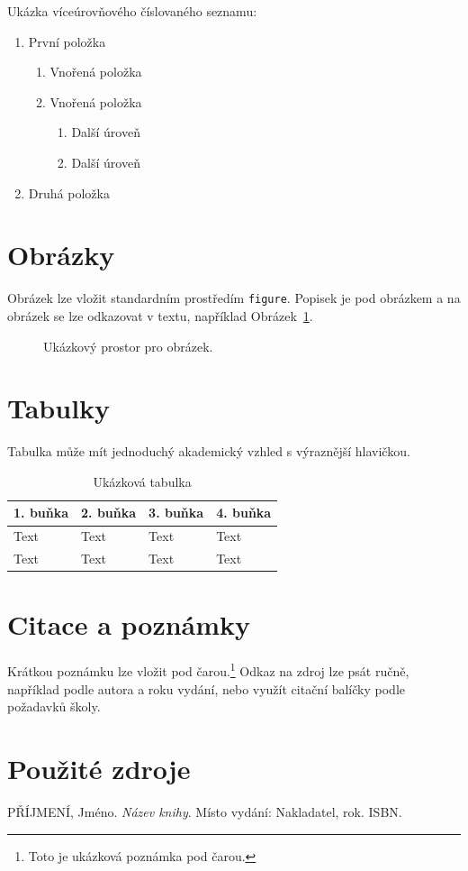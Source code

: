 \documentclass[12pt,a4paper]{article}
\begin{document}
Ukázka víceúrovňového číslovaného seznamu:
\begin{enumerate}[label=\arabic*)]
  \item První položka
  \begin{enumerate}[label=\alph*)]
    \item Vnořená položka
    \item Vnořená položka
    \begin{enumerate}[label=\roman*)]
      \item Další úroveň
      \item Další úroveň
    \end{enumerate}
  \end{enumerate}
  \item Druhá položka
\end{enumerate}

\section{Obrázky}
Obrázek lze vložit standardním prostředím \texttt{figure}. Popisek je pod obrázkem a na obrázek se lze odkazovat v textu, například Obrázek~\ref{fig:ukazka}.

\begin{figure}[h]
  \centering
  \fbox{\rule{0pt}{45mm}\rule{0.75\textwidth}{0pt}}
  \caption{Ukázkový prostor pro obrázek.}
  \label{fig:ukazka}
\end{figure}

\section{Tabulky}
Tabulka může mít jednoduchý akademický vzhled s výraznější hlavičkou.

\begin{table}[h]
  \centering
  \caption{Ukázková tabulka}
  \begin{tabularx}{\textwidth}{|Y|Y|Y|Y|}
    \hline
    \textbf{1. buňka} & \textbf{2. buňka} & \textbf{3. buňka} & \textbf{4. buňka} \\
    \hline
    Text & Text & Text & Text \\
    \hline
    Text & Text & Text & Text \\
    \hline
  \end{tabularx}
  \label{tab:ukazka}
\end{table}

\section{Citace a poznámky}
Krátkou poznámku lze vložit pod čarou.\footnote{Toto je ukázková poznámka pod čarou.} Odkaz na zdroj lze psát ručně, například podle autora a roku vydání, nebo využít citační balíčky podle požadavků školy.

\section{Použité zdroje}
\begin{thebibliography}{9}
  PŘÍJMENÍ, Jméno. \textit{Název knihy}. Místo vydání: Nakladatel, rok. ISBN.
\end{thebibliography}
\end{document}
